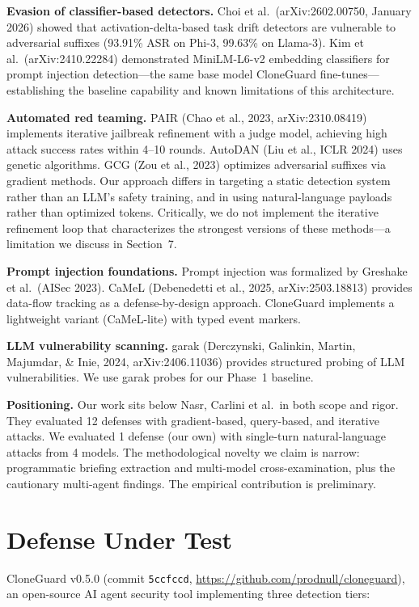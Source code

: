 \documentclass[11pt]{article}
\begin{document}
\textbf{Evasion of classifier-based detectors.} Choi et al.\ (arXiv:2602.00750, January 2026) showed that activation-delta-based task drift detectors are vulnerable to adversarial suffixes (93.91\% ASR on Phi-3, 99.63\% on Llama-3). Kim et al.\ (arXiv:2410.22284) demonstrated MiniLM-L6-v2 embedding classifiers for prompt injection detection---the same base model CloneGuard fine-tunes---establishing the baseline capability and known limitations of this architecture.

\textbf{Automated red teaming.} PAIR (Chao et al., 2023, arXiv:2310.08419) implements iterative jailbreak refinement with a judge model, achieving high attack success rates within 4--10 rounds. AutoDAN (Liu et al., ICLR 2024) uses genetic algorithms. GCG (Zou et al., 2023) optimizes adversarial suffixes via gradient methods. Our approach differs in targeting a static detection system rather than an LLM's safety training, and in using natural-language payloads rather than optimized tokens. Critically, we do not implement the iterative refinement loop that characterizes the strongest versions of these methods---a limitation we discuss in Section~7.

\textbf{Prompt injection foundations.} Prompt injection was formalized by Greshake et al.\ (AISec 2023). CaMeL (Debenedetti et al., 2025, arXiv:2503.18813) provides data-flow tracking as a defense-by-design approach. CloneGuard implements a lightweight variant (CaMeL-lite) with typed event markers.

\textbf{LLM vulnerability scanning.} garak (Derczynski, Galinkin, Martin, Majumdar, \& Inie, 2024, arXiv:2406.11036) provides structured probing of LLM vulnerabilities. We use garak probes for our Phase~1 baseline.

\textbf{Positioning.} Our work sits below Nasr, Carlini et al.\ in both scope and rigor. They evaluated 12 defenses with gradient-based, query-based, and iterative attacks. We evaluated 1 defense (our own) with single-turn natural-language attacks from 4 models. The methodological novelty we claim is narrow: programmatic briefing extraction and multi-model cross-examination, plus the cautionary multi-agent findings. The empirical contribution is preliminary.

\section{Defense Under Test}

CloneGuard v0.5.0 (commit \texttt{5ccfccd}, \url{https://github.com/prodnull/cloneguard}), an open-source AI agent security tool implementing three detection tiers:
\end{document}
